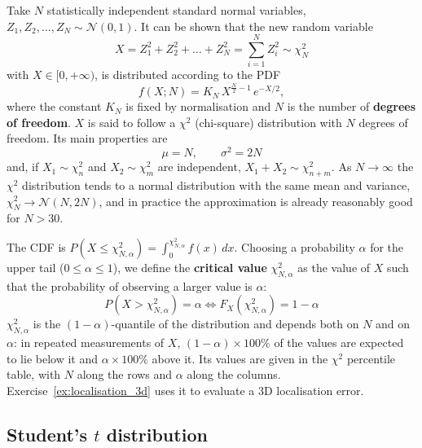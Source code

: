 \documentclass[letterpaper,11pt,leqno]{book}
\begin{document}
Take $N$ statistically independent standard normal variables, $Z_1, Z_2, \dots, Z_N \sim \mathcal{N}(0, 1)$. It can be shown that the new random variable
\begin{equation}
\boxed{X = Z_1^2 + Z_2^2 + \dots + Z_N^2 = \sum_{i=1}^{N}Z_i^2 \sim \chi_N^2}
\label{eq:chi2_definition}
\end{equation}
with $X \in [0, +\infty)$, is distributed according to the PDF
\begin{equation}
f(X; N) = K_N\,X^{\frac{N}{2} - 1}\,e^{-X/2},
\label{eq:chi2_pdf}
\end{equation}
where the constant $K_N$ is fixed by normalisation and $N$ is the number of \textbf{degrees of freedom}. $X$ is said to follow a $\chi^2$ (chi-square) distribution with $N$ degrees of freedom. Its main properties are
\begin{equation}
\boxed{\mu = N, \qquad \sigma^2 = 2N}
\label{eq:chi2_properties}
\end{equation}
and, if $X_1 \sim \chi_n^2$ and $X_2 \sim \chi_m^2$ are independent, $X_1 + X_2 \sim \chi_{n+m}^2$. As $N \to \infty$ the $\chi^2$ distribution tends to a normal distribution with the same mean and variance, $\chi_N^2 \to \mathcal{N}(N, 2N)$, and in practice the approximation is already reasonably good for $N > 30$.

The CDF is $P(X \le \chi_{N,\alpha}^2) = \int_0^{\chi_{N,\alpha}^2}f(x)\,dx$. Choosing a probability $\alpha$ for the upper tail ($0 \le \alpha \le 1$), we define the \textbf{critical value} $\chi_{N,\alpha}^2$ as the value of $X$ such that the probability of observing a larger value is $\alpha$:
\begin{equation}
\boxed{P(X > \chi_{N,\alpha}^2) = \alpha \iff F_X(\chi_{N,\alpha}^2) = 1 - \alpha}
\label{eq:chi2_critical}
\end{equation}
$\chi_{N,\alpha}^2$ is the $(1 - \alpha)$-quantile of the distribution and depends both on $N$ and on $\alpha$: in repeated measurements of $X$, $(1 - \alpha) \times 100\%$ of the values are expected to lie below it and $\alpha \times 100\%$ above it. Its values are given in the $\chi^2$ percentile table, with $N$ along the rows and $\alpha$ along the columns. Exercise~\ref{ex:localisation_3d} uses it to evaluate a 3D localisation error.

\subsection{Student's \texorpdfstring{$t$}{t} distribution}
\end{document}
